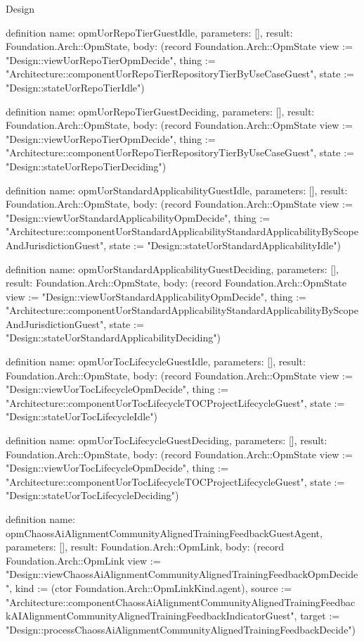 \begin{lexlean}{Design}
\begin{semanticmodule}
definition{
  name: opmUorRepoTierGuestIdle,
  parameters: [],
  result: Foundation.Arch::OpmState,
  body: (record Foundation.Arch::OpmState {view := "Design::viewUorRepoTierOpmDecide", thing := "Architecture::componentUorRepoTierRepositoryTierByUseCaseGuest", state := "Design::stateUorRepoTierIdle"})
}

definition{
  name: opmUorRepoTierGuestDeciding,
  parameters: [],
  result: Foundation.Arch::OpmState,
  body: (record Foundation.Arch::OpmState {view := "Design::viewUorRepoTierOpmDecide", thing := "Architecture::componentUorRepoTierRepositoryTierByUseCaseGuest", state := "Design::stateUorRepoTierDeciding"})
}

definition{
  name: opmUorStandardApplicabilityGuestIdle,
  parameters: [],
  result: Foundation.Arch::OpmState,
  body: (record Foundation.Arch::OpmState {view := "Design::viewUorStandardApplicabilityOpmDecide", thing := "Architecture::componentUorStandardApplicabilityStandardApplicabilityByScopeAndJurisdictionGuest", state := "Design::stateUorStandardApplicabilityIdle"})
}

definition{
  name: opmUorStandardApplicabilityGuestDeciding,
  parameters: [],
  result: Foundation.Arch::OpmState,
  body: (record Foundation.Arch::OpmState {view := "Design::viewUorStandardApplicabilityOpmDecide", thing := "Architecture::componentUorStandardApplicabilityStandardApplicabilityByScopeAndJurisdictionGuest", state := "Design::stateUorStandardApplicabilityDeciding"})
}

definition{
  name: opmUorTocLifecycleGuestIdle,
  parameters: [],
  result: Foundation.Arch::OpmState,
  body: (record Foundation.Arch::OpmState {view := "Design::viewUorTocLifecycleOpmDecide", thing := "Architecture::componentUorTocLifecycleTOCProjectLifecycleGuest", state := "Design::stateUorTocLifecycleIdle"})
}

definition{
  name: opmUorTocLifecycleGuestDeciding,
  parameters: [],
  result: Foundation.Arch::OpmState,
  body: (record Foundation.Arch::OpmState {view := "Design::viewUorTocLifecycleOpmDecide", thing := "Architecture::componentUorTocLifecycleTOCProjectLifecycleGuest", state := "Design::stateUorTocLifecycleDeciding"})
}

definition{
  name: opmChaossAiAlignmentCommunityAlignedTrainingFeedbackGuestAgent,
  parameters: [],
  result: Foundation.Arch::OpmLink,
  body: (record Foundation.Arch::OpmLink {view := "Design::viewChaossAiAlignmentCommunityAlignedTrainingFeedbackOpmDecide", kind := (ctor Foundation.Arch::OpmLinkKind.agent), source := "Architecture::componentChaossAiAlignmentCommunityAlignedTrainingFeedbackAIAlignmentCommunityAlignedTrainingFeedbackIndicatorGuest", target := "Design::processChaossAiAlignmentCommunityAlignedTrainingFeedbackDecide"})
}


\end{semanticmodule}
\end{lexlean}
